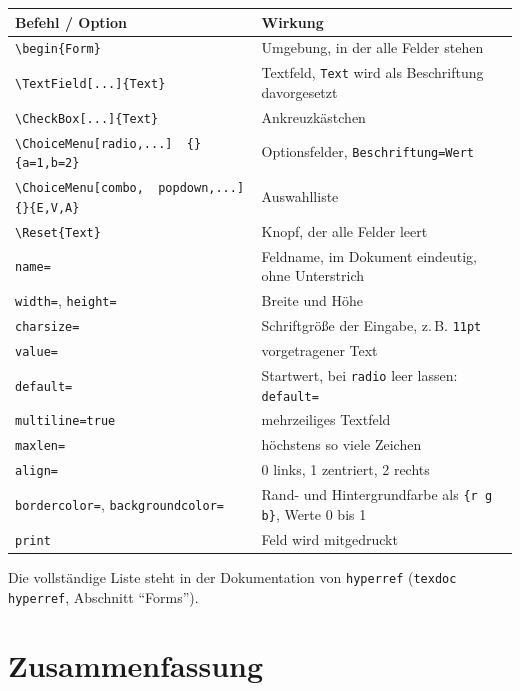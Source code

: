 \begin{Form}
\begin{tabular}{p{5.6cm} p{10cm}}
	\toprule
	\textbf{Befehl / Option} & \textbf{Wirkung} \\
	\midrule
	\verb|\begin{Form}| & Umgebung, in der alle Felder stehen \\
	\verb|\TextField[...]{Text}| & Textfeld, \texttt{Text} wird als Beschriftung davorgesetzt \\
	\verb|\CheckBox[...]{Text}| & Ankreuzkästchen \\
	\verb|\ChoiceMenu[radio,...]|\newline\verb|  {}{a=1,b=2}| & Optionsfelder, \texttt{Beschriftung=Wert} \\
	\verb|\ChoiceMenu[combo,|\newline\verb|  popdown,...]{}{E,V,A}| & Auswahlliste \\
	\verb|\Reset{Text}| & Knopf, der alle Felder leert \\
	\midrule
	\texttt{name=} & Feldname, im Dokument eindeutig, ohne Unterstrich \\
	\texttt{width=}, \texttt{height=} & Breite und Höhe \\
	\texttt{charsize=} & Schriftgröße der Eingabe, z.\,B. \texttt{11pt} \\
	\texttt{value=} & vorgetragener Text \\
	\texttt{default=} & Startwert, bei \texttt{radio} leer lassen: \texttt{default=} \\
	\texttt{multiline=true} & mehrzeiliges Textfeld \\
	\texttt{maxlen=} & höchstens so viele Zeichen \\
	\texttt{align=} & 0 links, 1 zentriert, 2 rechts \\
	\texttt{bordercolor=}, \texttt{backgroundcolor=} & Rand- und Hintergrundfarbe als \texttt{\{r g b\}}, Werte 0 bis 1 \\
	\texttt{print} & Feld wird mitgedruckt \\
	\bottomrule
\end{tabular}

Die vollständige Liste steht in der Dokumentation von \texttt{hyperref}
(\texttt{texdoc hyperref}, Abschnitt \enquote{Forms}).



\section{Zusammenfassung}


\end{Form}
